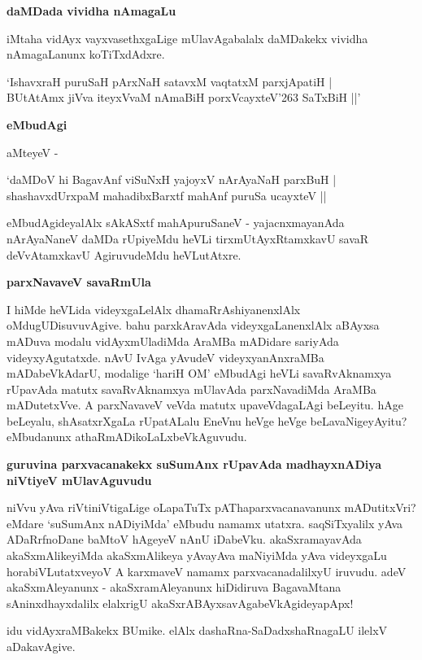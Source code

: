 \noindent
\textbf{daMDada vividha nAmagaLu}\label{page100}

iMtaha vidAyx vayxvasethxgaLige mUlavAgabalalx daMDakekx vividha nAmagaLanunx koTiTxdAdxre.

\begin{shloka}
`IshavxraH puruSaH pArxNaH satavxM vaqtatxM parxjApatiH |\\\label{100}
BUtAtAmx jiVva iteyxVvaM nAmaBiH porxVcayxteV\char'263 SaTxBiH ||'
\end{shloka}

\noindent
\textbf{eMbudAgi}

aMteyeV -

\begin{shloka}
`daMDoV hi BagavAnf viSuNxH yajoyxV nArAyaNaH parxBuH |\\\label{100}
shashavxdUrxpaM mahadibxBarxtf mahAnf puruSa ucayxteV ||
\end{shloka}

eMbudAgideyalAlx sAkASxtf mahApuruSaneV - yajacnxmayanAda nArAyaNaneV daMDa rUpiyeMdu heVLi tirxmUtAyxRtamxkavU savaR deVvAtamxkavU AgiruvudeMdu heVLutAtxre.

\noindent
\textbf{parxNavaveV savaRmUla}\label{page100}

I hiMde heVLida videyxgaLelAlx dhamaRrAshiyanenxlAlx oMdugUDisuvuvAgive. bahu parxkAravAda videyxgaLanenxlAlx aBAyxsa mADuva modalu vidAyxmUladiMda AraMBa mADidare sariyAda videyxyAgutatxde. nAvU IvAga yAvudeV videyxyanAnxraMBa mADabeVkAdarU, modalige `hariH OM' eMbudAgi heVLi savaRvAknamxya rUpavAda matutx savaRvAknamxya mUlavAda parxNavadiMda AraMBa mADutetxVve. A parxNavaveV veVda matutx upaveVdagaLAgi beLeyitu. hAge beLeyalu, shAsatxrXgaLa rUpatALalu EneVnu heVge heVge beLavaNigeyAyitu? eMbudanunx athaRmADikoLaLxbeVkAguvudu.

\noindent
\textbf{guruvina parxvacanakekx suSumAnx rUpavAda madhayxnADiya niVtiyeV mUlavAguvudu}\label{page101}

niVvu yAva riVtiniVtigaLige oLapaTuTx pAThaparxvacanavanunx mADutitxVri? eMdare `suSumAnx nADiyiMda' eMbudu namamx utatxra. saqSiTxyalilx yAva ADaRrfnoDane baMtoV hAgeyeV nAnU iDabeVku. akaSxramayavAda akaSxmAlikeyiMda akaSxmAlikeya yAvayAva maNiyiMda yAva videyxgaLu horabiVLutatxveyoV A karxmaveV namamx parxvacanadalilxyU iruvudu. adeV akaSxmAleyanunx - akaSxramAleyanunx hiDidiruva BagavaMtana sAninxdhayxdalilx elalxrigU akaSxrABAyxsavAgabeVkAgideyapApx!

idu vidAyxraMBakekx BUmike. elAlx dashaRna-SaDadxshaRnagaLU ilelxV aDakavAgive.

